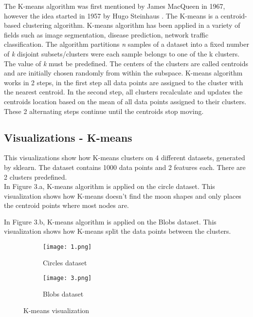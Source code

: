 \documentclass[a4paper]{article}
\begin{document}
The K-means algorithm was first mentioned by James MacQueen in 1967\cite{k-meansCreator}, however the idea started in 1957 by Hugo Steinhaus \cite{pre-k-means}. The K-means is a centroid-based clustering algorithm. K-means algorithm has been applied in a variety of fields such as image segmentation\cite{imageSeg}, disease prediction\cite{imageSegBrain}, network traffic classification\cite{erman2006traffic}. The algorithm partitions \textit{n} samples of a dataset into a fixed number of \textit{k} disjoint subsets/clusters were each sample belongs to one of the k clusters. The value of \textit{k} must be predefined. The centers of the clusters are called centroids and are initially chosen randomly from within the subspace. K-means algorithm works in 2 steps, in the first step all data points are assigned to the cluster with the nearest centroid. In the second step, all clusters recalculate and updates the centroids location based on the mean of all data points assigned to their clusters. These 2 alternating steps continue until the centroids stop moving.

\subsection{Visualizations - K-means}
This visualizations show how K-means clusters on 4 different datasets, generated by sklearn. 
The dataset contains 1000 data points and 2 features each. There are 2 clusters predefined.\newline\\
In Figure 3.a, K-means algorithm is applied on the circle dataset. This visualization shows how K-means doesn't find the moon shapes and only places the centroid points where most nodes are.

In Figure 3.b, K-means algorithm is applied on the Blobs dataset. This visualization shows how K-means split the data points between the clusters.


\begin{figure}[H]
\begin{subfigure}[h]{0.5\linewidth}
\texttt{[image: 1.png]}
\caption{Circles dataset}
\end{subfigure}
\hfill
\begin{subfigure}[h]{0.5\linewidth}
\texttt{[image: 3.png]}
\caption{Blobs dataset}
\end{subfigure}%
\caption{K-means visualization}
\end{figure}
\newpage
\end{document}
